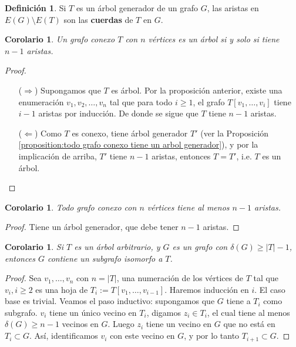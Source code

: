 \documentclass[12pt]{report}
\theoremstyle{plain}
\newtheorem{corollary}[theorem]{Corolario}
\theoremstyle{definition}
\newtheorem{definition}[theorem]{Definición}
\newcommand{\abs}[1]{\left \vert #1 \right \vert}
\begin{document}



\begin{definition}
Si $T$ es un árbol generador de un grafo $G$, las aristas en $E(G) \setminus E(T)$ son las \textbf{cuerdas} de $T$ en $G$.
\end{definition}








\begin{corollary}\label{corolario:todo grafo conexo de n vertices es un arbol si y solo si tiene n-1 aristas}
Un grafo conexo $T$ con $n$ vértices es un árbol si y solo si tiene $n-1$ aristas.
\end{corollary}
\begin{proof}
\begin{enumerate}
\item[($\Rightarrow$)] Supongamos que $T$ es árbol. Por la proposición anterior, existe una enumeración $v_1,v_2,\ldots,v_n$ tal que para todo $i \geq 1$, el grafo $T[v_1,\ldots, v_i]$ tiene $i-1$ aristas por inducción. De donde se sigue que $T$ tiene $n-1$ aristas.

\item[($\Leftarrow$)] Como $T$ es conexo, tiene árbol generador $T'$ (ver la Proposición \ref{proposition:todo grafo conexo tiene un arbol generador}), y por la implicación de arriba, $T'$ tiene $n-1$ aristas, entonces $T = T'$, i.e. $T$ es un árbol.
\end{enumerate}
\end{proof}

\begin{corollary}
Todo grafo conexo con $n$ vértices tiene al menos $n-1$ aristas.
\end{corollary}
\begin{proof}
Tiene un árbol generador, que debe tener $n-1$ aristas.
\end{proof}

\begin{corollary}
Si $T$ es un árbol arbitrario, y $G$ es un grafo con $\delta (G) \geq \abs T -1$, entonces $G$ contiene un subgrafo isomorfo a $T$.
\end{corollary}
\begin{proof}
Sea $v_1,\ldots,v_n$ con $n = \abs T$, una numeración de los vértices de $T$ tal que $v_i, i \geq 2$ es una hoja de $T_i := T[v_1,\ldots,v_{i-1}]$. Haremos inducción en $i$. El caso base es trivial. Veamos el paso inductivo: supongamos que $G$ tiene a $T_i$ como subgrafo. $v_i$ tiene un único vecino en $T_i$, digamos $z_i \in T_i$, el cual tiene al menos $\delta (G) \geq n-1$ vecinos en $G$. Luego $z_i$ tiene un vecino en $G$ que no está en $T_i \subset G$. Así, identificamos $v_i$ con este vecino en $G$, y por lo tanto $T_{i+1} \subset G$.
\end{proof}
\end{document}
